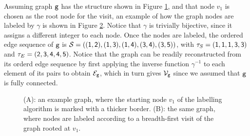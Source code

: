 Assuming graph $\mathtt{g}$ has the structure shown in Figure \ref{fig:example-graph}, and that node $v_1$ is chosen as the root node for the visit, an example of how the graph nodes are labeled by $\gamma$ is shown in Figure \ref{fig:labeled-graph}. Notice that $\gamma$ is trivially bijective, since it assigns a different integer to each node. Once the nodes are labeled, the ordered edge sequence of $\mathtt{g}$ is $\OES{S} = (\OElem{1}{2},\OElem{1}{3},\OElem{1}{4},\OElem{3}{4},\OElem{3}{5})$, with $\tau_S = (\mathsf{1},\mathsf{1},\mathsf{1},\mathsf{3},\mathsf{3})$ and $\tau_E = (\mathsf{2},\mathsf{3},\mathsf{4},\mathsf{4},\mathsf{5})$. Notice that the graph can be readily reconstructed from its orderd edge sequence by first applying the inverse function $\gamma^{-1}$ to each element of its pairs to obtain $\Edges{g}$, which in turn gives $\Nodes{g}$ since we assumed that $\mathtt{g}$ is fully connected.

\begin{figure}[h!]
    \begin{subfigure}[b]{0.48\linewidth}
        \centering
        \resizebox{.8\textwidth}{!}{}
        \caption{}
        \label{fig:example-graph}
    \end{subfigure}
    \begin{subfigure}[b]{0.48\linewidth}
        \centering
        \resizebox{.8\textwidth}{!}{}
        \caption{}
        \label{fig:labeled-graph}
    \end{subfigure}
    \caption{({\scriptsize A}): an example graph, where the starting node $v_1$ of the labelling algorithm is marked with a thicker border. ({\scriptsize B}): the same graph, where nodes are labeled according to a breadth-first visit of the graph rooted at $v_1$.}
    \label{fig:labelling-example}
\end{figure}

